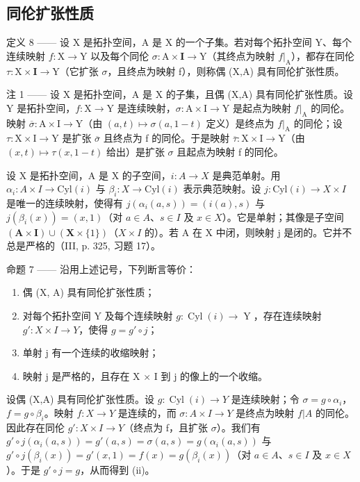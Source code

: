 \subsection{同伦扩张性质}

定义 8 —— 设 X 是拓扑空间，A 是 X 的一个子集。若对每个拓扑空间 Y、每个连续映射 \(f:\mathrm{X}\to\mathrm{Y}\) 以及每个同伦 \(\sigma:\mathrm{A}\times\mathbf{I}\to\mathrm{Y}\)（其终点为映射 \(f|_{\mathrm{A}}\)），都存在同伦 \(\tau:\mathrm{X}\times\mathbf{I}\to\mathrm{Y}\)（它扩张 \(\sigma\)，且终点为映射 f），则称偶 (X,A) 具有同伦扩张性质。

注 1 —— 设 X 是拓扑空间，A 是 X 的子集，且偶 (X,A) 具有同伦扩张性质。设 Y 是拓扑空间，\(f:\mathrm{X}\to\mathrm{Y}\) 是连续映射，\(\sigma:\mathrm{A}\times\mathrm{I}\to\mathrm{Y}\) 是起点为映射 \(f|_{\mathrm{A}}\) 的同伦。映射 \(\overline{\sigma}:\mathrm{A}\times\mathrm{I}\to\mathrm{Y}\)（由 \((a,t)\mapsto\sigma(a,1-t)\) 定义）是终点为 \(f|_{\mathrm{A}}\) 的同伦；设 \(\tau:\mathrm{X}\times\mathrm{I}\to\mathrm{Y}\) 是扩张 \(\overline{\sigma}\) 且终点为 f 的同伦。于是映射 \(\overline{\tau}:\mathrm{X}\times\mathrm{I}\to\mathrm{Y}\)（由 \((x,t)\mapsto\tau(x,1-t)\) 给出）是扩张 \(\sigma\) 且起点为映射 f 的同伦。

设 X 是拓扑空间，A 是 X 的子空间，\(i: A \to X\) 是典范单射。用 \(\alpha_{i}: A \times I \to \text{Cyl}(i)\) 与 \(\beta_{i}: X \to \text{Cyl}(i)\) 表示典范映射。设 \(j: \text{Cyl}(i) \to X \times I\) 是唯一的连续映射，使得有 \(j(\alpha_{i}(a, s)) = (i(a), s)\) 与 \(j(\beta_{i}(x)) = (x, 1)\)（对 \(a \in A\)、\(s \in I\) 及 \(x \in X\)）。它是单射；其像是子空间 \((\mathbf{A} \times \mathbf{I}) \cup (\mathbf{X} \times \{1\})\)（\(X \times I\) 的）。若 A 在 X 中闭，则映射 j 是闭的。它并不总是严格的（III, p. 325, 习题 17）。

命题 7 —— 沿用上述记号，下列断言等价：

\begin{enumerate}
\def\labelenumi{(\roman{enumi})}
\item
  偶 (X, A) 具有同伦扩张性质；
\item
  对每个拓扑空间 Y 及每个连续映射 \(g\colon \operatorname{Cyl}(i) \to \operatorname{Y}\)，存在连续映射 \(g'\colon X \times I \to Y\)，使得 \(g = g' \circ j\)；
\item
  单射 j 有一个连续的收缩映射；
\item
  映射 j 是严格的，且存在 X × I 到 j 的像上的一个收缩。
\end{enumerate}

设偶 (X,A) 具有同伦扩张性质。设 \(g:\operatorname{Cyl}(i)\to Y\) 是连续映射；令 \(\sigma=g\circ\alpha_i\)，\(f=g\circ\beta_i\)。映射 \(f:X\to Y\) 是连续的，而 \(\sigma:A\times I\to Y\) 是终点为映射 \(f|A\) 的同伦。因此存在同伦 \(g':X\times I\to Y\)（终点为 f，且扩张 \(\sigma\)）。我们有 \(g'\circ j(\alpha_i(a,s))=g'(a,s)=\sigma(a,s)=g(\alpha_i(a,s))\) 与 \(g'\circ j(\beta_i(x))=g'(x,1)=f(x)=g(\beta_i(x))\)（对 \(a\in A\)、\(s\in I\) 及 \(x\in X\)）。于是 \(g'\circ j=g\)，从而得到 (ii)。

